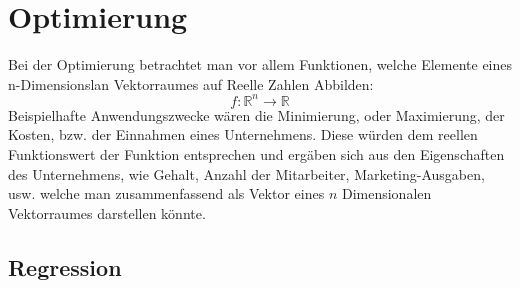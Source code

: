 	\section{Optimierung}
Bei der Optimierung betrachtet man vor allem Funktionen, welche Elemente eines n-Dimensionslan Vektorraumes auf Reelle Zahlen Abbilden:
	\[f: \mathbb{R}^n \rightarrow \mathbb{R}\]
	Beispielhafte Anwendungszwecke wären die Minimierung, oder Maximierung, der Kosten, bzw. der Einnahmen eines Unternehmens. Diese würden dem reellen Funktionswert der Funktion entsprechen und ergäben sich aus den Eigenschaften des Unternehmens, wie Gehalt, Anzahl der Mitarbeiter, Marketing-Ausgaben, usw. welche man zusammenfassend als Vektor eines $n$ Dimensionalen Vektorraumes darstellen könnte.\\
	\subsection{Regression}
